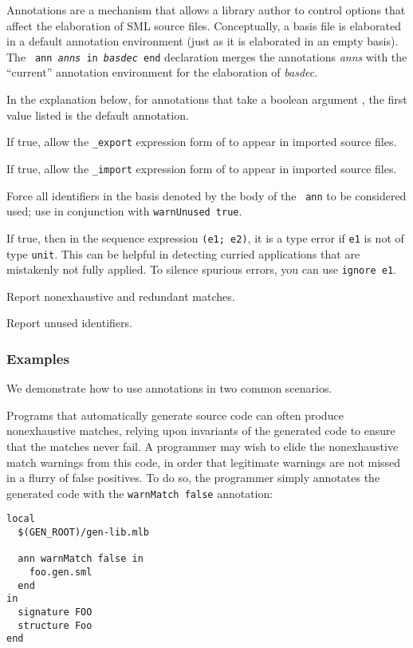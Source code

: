 %

Annotations are a mechanism that allows a library author to control
options that affect the elaboration of SML source files.
Conceptually, a basis file is elaborated in a default annotation
environment (just as it is elaborated in an empty basis).  The {\tt
ann {\it anns} in {\it basdec} end} declaration merges the annotations
{\it anns} with the ``current'' annotation environment for the
elaboration of {\it basdec}.  

In the explanation below, for annotations that take a boolean argument
{\tt \trueFalse}, the first value listed is the default annotation.

\begin{description}
If true, allow the {\tt \_export} expression form of  to
appear in imported source files.

If true, allow the {\tt \_import} expression form of  to
appear in imported source files.

Force all identifiers in the basis denoted by the body of the {\tt
ann} to be considered used; use in conjunction with {\tt warnUnused
true}.

If true, then in the sequence expression {\tt (e1; e2)}, it is a type
error if {\tt e1} is not of type {\tt unit}.  This can be helpful in
detecting curried applications that are mistakenly not fully applied.
To silence spurious errors, you can use {\tt ignore e1}.

Report nonexhaustive and redundant matches.

Report unused identifiers.
\end{description}

%
\subsubsection{Examples}

We demonstrate how to use annotations in two common scenarios.

Programs that automatically generate source code can often produce
nonexhaustive matches, relying upon invariants of the generated code
to ensure that the matches never fail.  A programmer may wish to elide
the nonexhaustive match warnings from this code, in order that
legitimate warnings are not missed in a flurry of false positives.  To
do so, the programmer simply annotates the generated code with the
{\tt warnMatch false} annotation:
\begin{verbatim}
local
  $(GEN_ROOT)/gen-lib.mlb

  ann warnMatch false in
    foo.gen.sml
  end
in
  signature FOO
  structure Foo
end
\end{verbatim}

